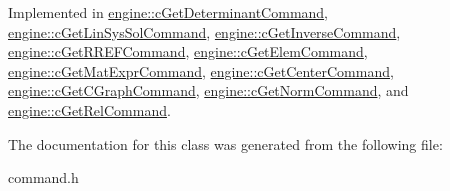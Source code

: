 Implemented in \hyperlink{classengine_1_1cGetDeterminantCommand_acd191b8e162f5d2396d1b61973b8fd69}{engine\-::c\-Get\-Determinant\-Command}, \hyperlink{classengine_1_1cGetLinSysSolCommand_a0307c18a7b86758e315e4c69c0b94a81}{engine\-::c\-Get\-Lin\-Sys\-Sol\-Command}, \hyperlink{classengine_1_1cGetInverseCommand_a1ed3cfe7f5d5ec7025da86522d2c69cf}{engine\-::c\-Get\-Inverse\-Command}, \hyperlink{classengine_1_1cGetRREFCommand_ac2bf1ab437a8e977986c73f5cd85ac3c}{engine\-::c\-Get\-R\-R\-E\-F\-Command}, \hyperlink{classengine_1_1cGetElemCommand_ad84c73fe5b4db65679f28c427d201434}{engine\-::c\-Get\-Elem\-Command}, \hyperlink{classengine_1_1cGetMatExprCommand_a6a9c787618267539be3004983c3d1747}{engine\-::c\-Get\-Mat\-Expr\-Command}, \hyperlink{classengine_1_1cGetCenterCommand_ab00fa221228c2550e8f664c6d887e1e0}{engine\-::c\-Get\-Center\-Command}, \hyperlink{classengine_1_1cGetCGraphCommand_a0a3d07c4f82227b7f0ffbcf01f7fcec2}{engine\-::c\-Get\-C\-Graph\-Command}, \hyperlink{classengine_1_1cGetNormCommand_afee08e7e84b009b5f3d41b9888f80f2c}{engine\-::c\-Get\-Norm\-Command}, and \hyperlink{classengine_1_1cGetRelCommand_ad6aa9cb526ae1b73237edaad02d081ec}{engine\-::c\-Get\-Rel\-Command}.



The documentation for this class was generated from the following file\-:\begin{DoxyCompactItemize}
\item 
command.\-h\end{DoxyCompactItemize}
